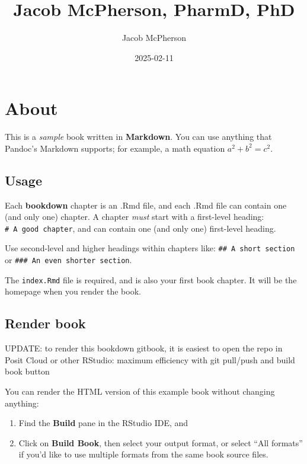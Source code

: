 \documentclass[
]{book}
\title{Jacob McPherson, PharmD, PhD}
\author{Jacob McPherson}
\date{2025-02-11}
\begin{document}
\maketitle

{
\setcounter{tocdepth}{1}
\tableofcontents
}
\chapter{About}\label{about}

This is a \emph{sample} book written in \textbf{Markdown}. You can use anything that Pandoc's Markdown supports; for example, a math equation \(a^2 + b^2 = c^2\).

\section{Usage}\label{usage}

Each \textbf{bookdown} chapter is an .Rmd file, and each .Rmd file can contain one (and only one) chapter. A chapter \emph{must} start with a first-level heading: \texttt{\#\ A\ good\ chapter}, and can contain one (and only one) first-level heading.

Use second-level and higher headings within chapters like: \texttt{\#\#\ A\ short\ section} or \texttt{\#\#\#\ An\ even\ shorter\ section}.

The \texttt{index.Rmd} file is required, and is also your first book chapter. It will be the homepage when you render the book.

\section{Render book}\label{render-book}

UPDATE: to render this bookdown gitbook, it is easiest to open the repo in Posit Cloud or other RStudio: maximum efficiency with git pull/push and build book button

You can render the HTML version of this example book without changing anything:

\begin{enumerate}
\def\labelenumi{\arabic{enumi}.}
\item
  Find the \textbf{Build} pane in the RStudio IDE, and
\item
  Click on \textbf{Build Book}, then select your output format, or select ``All formats'' if you'd like to use multiple formats from the same book source files.
\end{enumerate}
\end{document}
